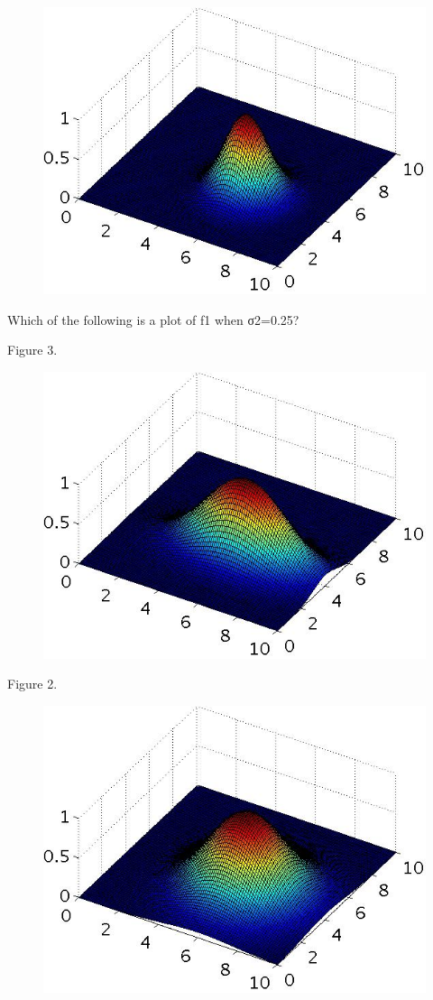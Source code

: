 \documentclass[11pt]{article} %
\begin{document}
\begin{figure}
	\centering
	\includegraphics[width=0.7\linewidth]{images/SVM2}

\end{figure}
Which of the following is a plot of f1 when σ2=0.25?


Figure 3.
\begin{figure}
	\centering
	\includegraphics[width=0.7\linewidth]{images/SVM3}
\end{figure}

Figure 2.
\begin{figure}
	\centering
	\includegraphics[width=0.7\linewidth]{images/SVM4}
\end{figure}
\end{document}
